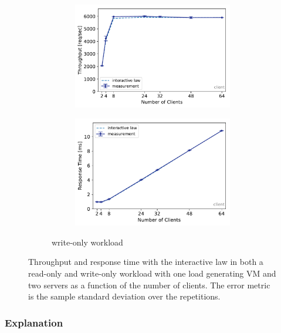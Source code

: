 \documentclass[report.tex]{subfiles}
\begin{document}
\begin{figure}[H]
\begin{subfigure}{\linewidth}
\begin{subfigure}[b]{.49\linewidth}
		\includegraphics[width=\linewidth]{data/exp22_wo_tp_nc.pdf}
	\end{subfigure}\hfill
	\begin{subfigure}[b]{.49\linewidth}
		\centering
		\includegraphics[width=\linewidth]{data/exp22_wo_rt_nc.pdf}
	\end{subfigure}%
	\caption{write-only workload}
	\label{exp22_wo_nc}
\end{subfigure}
\caption{Throughput and response time with the interactive law in both a read-only and write-only workload with one load generating VM and two servers as a function of the number of clients. The error metric is the sample standard deviation over the repetitions.}
\end{figure}



\subsubsection{Explanation}
\end{document}
